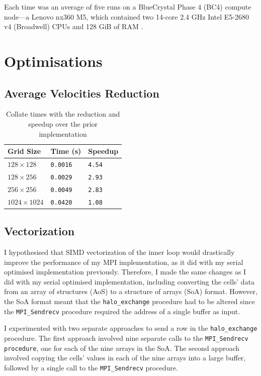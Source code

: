 \documentclass[twocolumn, a4paper]{article}
\begin{document}
Each time was an average of five runs on a BlueCrystal Phase 4 (BC4) compute node---a Lenovo nx360 M5, which contained two 14-core 2.4 GHz Intel E5-2680 v4 (Broadwell) CPUs and 128 GiB of RAM \cite{bcp4}.

\section{Optimisations}

\subsection{Average Velocities Reduction}

\begin{table}[htbp]
  \begin{center}
  \caption{Collate times with the reduction and speedup over the prior implementation}\label{tab:reduction}
  \begin{tabular}[t]{l | l l} 
      \hline\hline
      Grid Size&Time (s)&Speedup\\
      \hline
      $128 \times 128$&\texttt{0.0016}&\texttt{4.54}\\
      $128 \times 256$&\texttt{0.0029}&\texttt{2.93}\\
      $256 \times 256$&\texttt{0.0049}&\texttt{2.83}\\
      $1024 \times 1024$&\texttt{0.0420}&\texttt{1.08}\\
      \hline
    \end{tabular}
  \end{center}
\end{table}

\subsection{Vectorization}

I hypothesised that SIMD vectorization of the inner loop would drastically improve the performance of my MPI implementation, as it did with my serial optimised implementation previously.
Therefore, I made the same changes as I did with my serial optimised implementation, including converting the cells' data from an array of structures (AoS) to a structure of arrays (SoA) format.
However, the SoA format meant that the \texttt{halo\_exchange} procedure had to be altered since the \texttt{MPI\_Sendrecv} procedure required the address of a single buffer as input.

I experimented with two separate approaches to send a row in the \texttt{halo\_exchange} procedure.
The first approach involved nine separate calls to the \texttt{MPI\_Sendrecv procedure}, one for each of the nine arrays in the SoA.
The second approach involved copying the cells' values in each of the nine arrays into a large buffer, followed by a single call to the \texttt{MPI\_Sendrecv} procedure.
\end{document}
